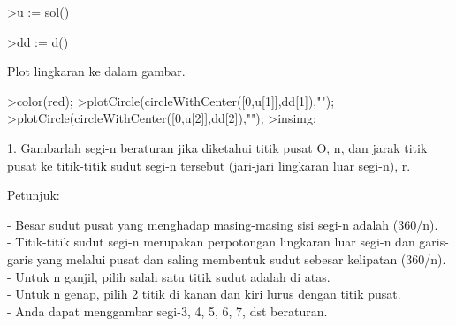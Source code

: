 \documentclass[a4paper,10pt]{article}
\begin{document}
\begin{eulernotebook}
\begin{eulercomment}
\begin{eulercomment}
\begin{eulercomment}
\begin{eulercomment}
\begin{eulercomment}
\begin{eulercomment}
\begin{eulercomment}
\begin{eulercomment}
\begin{eulercomment}
\begin{eulercomment}
\begin{eulercomment}
\begin{eulercomment}
\begin{eulercomment}
\begin{eulercomment}
\begin{eulercomment}
\begin{eulercomment}
\begin{eulercomment}
\end{eulercomment}
\begin{eulerprompt}
>u := sol()
\end{eulerprompt}
\begin{euleroutput}
  [0.558482,  4.77485]
\end{euleroutput}
\begin{eulerprompt}
>dd := d()
\end{eulerprompt}
\begin{euleroutput}
  [0.394906,  3.37633]
\end{euleroutput}
\begin{eulercomment}
Plot lingkaran ke dalam gambar.
\end{eulercomment}
\begin{eulerprompt}
>color(red);
>plotCircle(circleWithCenter([0,u[1]],dd[1]),"");
>plotCircle(circleWithCenter([0,u[2]],dd[2]),"");
>insimg;
\end{eulerprompt}
\begin{eulercomment}
1. Gambarlah segi-n beraturan jika diketahui titik pusat O, n, dan
jarak titik pusat ke titik-titik sudut segi-n tersebut (jari-jari
lingkaran luar segi-n), r.

Petunjuk:

- Besar sudut pusat yang menghadap masing-masing sisi segi-n adalah
(360/n).\\
- Titik-titik sudut segi-n merupakan perpotongan lingkaran luar segi-n
dan garis-garis yang melalui pusat dan saling membentuk sudut sebesar
kelipatan (360/n).\\
- Untuk n ganjil, pilih salah satu titik sudut adalah di atas.\\
- Untuk n genap, pilih 2 titik di kanan dan kiri lurus dengan titik
pusat.\\
- Anda dapat menggambar segi-3, 4, 5, 6, 7, dst beraturan.


\end{eulercomment}
\end{eulercomment}
\end{eulercomment}
\end{eulercomment}
\end{eulercomment}
\end{eulercomment}
\end{eulercomment}
\end{eulercomment}
\end{eulercomment}
\end{eulercomment}
\end{eulercomment}
\end{eulercomment}
\end{eulercomment}
\end{eulercomment}
\end{eulercomment}
\end{eulercomment}
\end{eulercomment}
\end{eulernotebook}
\end{document}
